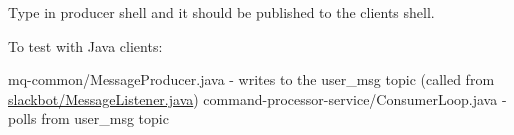 Type in producer shell and it should be published to the client\textquotesingle{}s shell.


\begin{DoxyEnumerate}
\item To test with Java clients\+:
\end{DoxyEnumerate}

mq-\/common/\+Message\+Producer.\+java -\/ writes to the user\+\_\+msg topic (called from \hyperlink{_message_listener_8java}{slackbot/\+Message\+Listener.\+java}) command-\/processor-\/service/\+Consumer\+Loop.\+java -\/ polls from user\+\_\+msg topic 